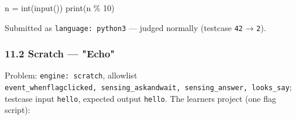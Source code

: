 \documentclass[
]{article}
\newenvironment{Shaded}{}{}
\newcommand{\BuiltInTok}[1]{\textcolor[rgb]{0.00,0.50,0.00}{#1}}
\newcommand{\DecValTok}[1]{\textcolor[rgb]{0.25,0.63,0.44}{#1}}
\newcommand{\NormalTok}[1]{#1}
\newcommand{\OperatorTok}[1]{\textcolor[rgb]{0.40,0.40,0.40}{#1}}
\begin{document}
\begin{Shaded}
\begin{Highlighting}[]
\NormalTok{n }\OperatorTok{=} \BuiltInTok{int}\NormalTok{(}\BuiltInTok{input}\NormalTok{())}
\BuiltInTok{print}\NormalTok{(n }\OperatorTok{\%} \DecValTok{10}\NormalTok{)}
\end{Highlighting}
\end{Shaded}

Submitted as \texttt{language:\ python3} --- judged normally (testcase
\texttt{42} → \texttt{2}).

\subsubsection{11.2 Scratch --- "Echo"}\label{112-scratch--echo}

Problem: \texttt{engine:\ scratch}, allowlist
\texttt{event\_whenflagclicked,\ sensing\_askandwait,\ sensing\_answer,\ looks\_say};
testcase input \texttt{hello}, expected output \texttt{hello}. The
learner\textquotesingle s project (one flag script):
\end{document}
